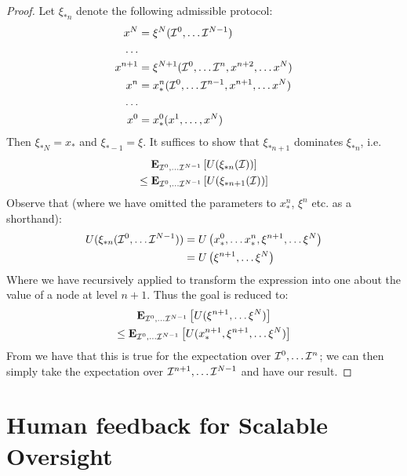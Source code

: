 \begin{proof}
Let $\xi_{*n}$ denote the following admissible protocol:
  \begin{align*}
    x^N &= \xi^N(\mathcal{I}^0,\dots\mathcal{I}^{N-1}) \\
    \dots&\\
    x^{n+1} &= \xi^{N+1}(\mathcal{I}^0,\dots\mathcal{I}^{n},x^{n+2},\dots x^N)\\
    x^n &= x_*^n(\mathcal{I}^0,\dots\mathcal{I}^{n-1}, x^{n+1},\dots x^N) \\
    \dots&\\
    x^0 &= x_*^0(x^1,\dots, x^N) \\
  \end{align*}
  Then $\xi_{*N}=x_*$ and $\xi_{*-1}=\xi$. It suffices to show that $\xi_{*n+1}$ dominates $\xi_{*n}$, i.e.
  \begin{multline*}
    \Expectofu[\infooffers^0,\dots\infooffers^{N-1}]{U(\xi_{*n}(\infooffers))} \\
    \le \Expectofu[\infooffers^0,\dots\infooffers^{N-1}]{U(\xi_{*n+1}(\infooffers))}
  \end{multline*}
  Observe that (where we have omitted the parameters to $x^n_*$, $\xi^n$ etc. as a shorthand):
  \begin{align*}
  U(\xi_{*n}(\mathcal{I}^0,\dots\mathcal{I}^{N-1})) &= U\left(
    x^0_*, \dots x^n_*,\xi^{n+1},\dots\xi^N
  \right) \\
  &= U\left(\xi^{n+1},\dots\xi^N\right)
  \end{align*}
  Where we have recursively applied  to transform the expression into one about the value of a node at level $n+1$. Thus the goal is reduced to:
  \begin{multline*}
    \Expectofu[\infooffers^0,\dots\infooffers^{N-1}]{U(\xi^{n+1},\dots \xi^N)} \\
    \le \Expectofu[\infooffers^0,\dots\infooffers^{N-1}]{U(x_*^{n+1}, \xi^{n+1},\dots \xi^N)}
  \end{multline*}
  From  we have that this is true for the expectation over $\mathcal{I}^0,\dots\mathcal{I}^{n}$; we can then simply take the expectation over $\mathcal{I}^{n+1},\dots\mathcal{I}^{N-1}$ and have our result.
\end{proof}

\section{Human feedback for Scalable Oversight}
\label{sec:scoring}


